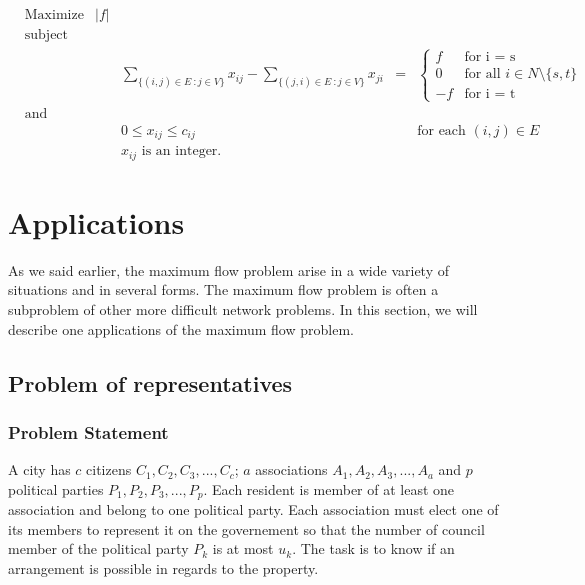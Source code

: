 \begin{equation}
\begin{aligned}
& {\text{Maximize}} & \left\vert{f}\right\vert & & &\\
& \text{subject to} & & & &\\
& & & \sum\limits_{\{(i,j)\in E\ : j \in V\}} x_{ij} - \sum\limits_{\{(j,i)\in E\ : j \in V\}} x_{ji} & = & \begin{cases}
               f & \text{for i = s} \\
               0 & \text{for all } i \in N \setminus \{s, t\} \\
               -f & \text{for i = t}
            \end{cases}\\
& \text{and} & & & & \\
& & & 0 \leq x_{ij} \leq c_{ij} & & \text{for each } (i, j) \in E\\
& & & x_{ij} \text{ is an integer.}& &
\end{aligned}
\end{equation}

\section{Applications}
\label{sec:applications}
As we said earlier, the maximum flow problem arise in a wide variety of situations and in several forms. The maximum flow problem is often a subproblem of other more difficult network problems. In this section, we will describe one applications of the maximum flow problem.

\subsection{Problem of representatives}

\subsubsection{Problem Statement}

A city has $c$ citizens $C_1, C_2, C_3, ..., C_c$; $a$ associations $A_1, A_2, A_3, ..., A_a$ and $p$ political parties $P_1, P_2, P_3, ..., P_p$. Each resident is member of at least one association and belong to one political party. Each association  must elect one of its members to represent it on the governement so that the number of council member of the political party $P_k$ is at most $u_k$. The task is to know if an arrangement is possible in regards to the property.

